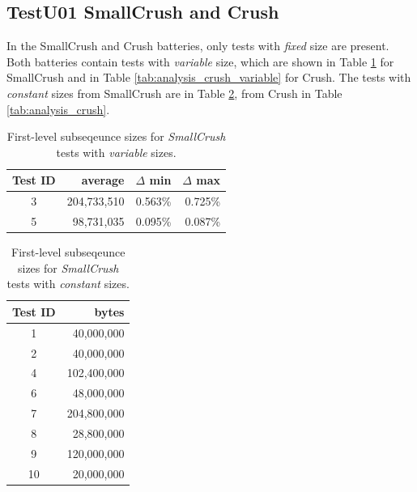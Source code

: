 \documentclass[
  digital,     %
  oneside,     %
  nosansbold,  %
  nocolorbold, %
  nolof,         %
  nolot,         %
]{fithesis4}
\begin{document}
\subsection{TestU01 SmallCrush and Crush}
In the SmallCrush and Crush batteries, only tests with \emph{fixed} size are present. Both batteries contain tests with \emph{variable} size, which are shown in Table \ref{tab:analysis_smallcrush_variable} for SmallCrush and in Table \ref{tab:analysis_crush_variable} for Crush. The tests with \emph{constant} sizes from SmallCrush are in Table \ref{tab:analysis_smallcrush}, from Crush in  Table \ref{tab:analysis_crush}.


\begin{table}[H]
  \begin{tabularx}{0.75\textwidth}{c|r|r|r}
    Test ID & average & $\Delta$ min & $\Delta$ max\\
    \midrule
    3 & 204,733,510 & 0.563\% & 0.725\% \\
    5 & 98,731,035 & 0.095\% & 0.087\% \\
  \end{tabularx}
  \caption{First-level subseqeunce sizes for \emph{SmallCrush} tests with \emph{variable} sizes.}
  \label{tab:analysis_smallcrush_variable}
\end{table}

\begin{table}[H]
  \begin{tabularx}{0.4\textwidth}{c|r}
  Test ID & bytes \\
  \midrule
    1 & 40,000,000 \\
    2 & 40,000,000 \\
    4 & 102,400,000 \\
    6 & 48,000,000 \\
    7 & 204,800,000 \\
    8 & 28,800,000 \\
    9 & 120,000,000 \\
    10 & 20,000,000 \\

  \end{tabularx}
  \caption{First-level subseqeunce sizes for \emph{SmallCrush} tests with \emph{constant} sizes.}
  \label{tab:analysis_smallcrush}
\end{table}
\end{document}
